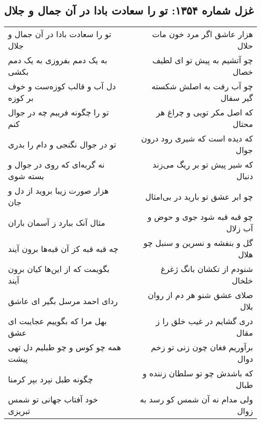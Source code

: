 \begin{center}
\section*{غزل شماره ۱۳۵۴: تو را سعادت بادا در آن جمال و جلال}
\label{sec:1354}
\begin{longtable}{l p{0.5cm} r}
تو را سعادت بادا در آن جمال و جلال
&&
هزار عاشق اگر مرد خون مات حلال
\\
به یک دمم بفروزی به یک دمم بکشی
&&
چو آتشیم به پیش تو ای لطیف خصال
\\
دل آب و قالب کوزه‌ست و خوف بر کوزه
&&
چو آب رفت به اصلش شکسته گیر سفال
\\
تو را چگونه فریبم چه در جوال کنم
&&
که اصل مکر تویی و چراغ هر محتال
\\
تو در جوال نگنجی و دام را بدری
&&
که دیده است که شیری رود درون جوال
\\
نه گربه‌ای که روی در جوال و بسته شوی
&&
که شیر پیش تو بر ریگ می‌زند دنبال
\\
هزار صورت زیبا بروید از دل و جان
&&
چو ابر عشق تو بارید در بی‌امثال
\\
مثال آنک ببارد ز آسمان باران
&&
چو قبه قبه شود جوی و حوض و آب زلال
\\
چه قبه قبه کز آن قبه‌ها برون آیند
&&
گل و بنفشه و نسرین و سنبل چو هلال
\\
بگویمت که از این‌ها کیان برون آیند
&&
شنودم از تکشان بانگ ژغرغ خلخال
\\
ردای احمد مرسل بگیر ای عاشق
&&
صلای عشق شنو هر دم از روان بلال
\\
بهل مرا که بگوییم عجایبت ای عشق
&&
دری گشایم در غیب خلق را ز مقال
\\
همه چو کوس و چو طبلیم دل تهی پیشت
&&
برآوریم فغان چون زنی تو زخم دوال
\\
چگونه طبل نپرد بپر کرمنا
&&
که باشدش چو تو سلطان زننده و طبال
\\
خود آفتاب جهانی تو شمس تبریزی
&&
ولی مدام نه آن شمس کو رسد به زوال
\\
\end{longtable}
\end{center}
